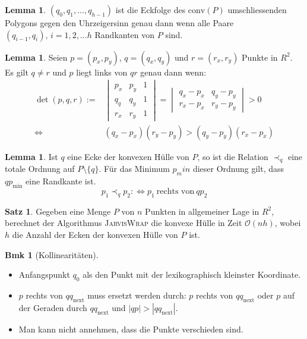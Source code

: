 \documentclass[a4paper, 10pt]{article}
\theoremstyle{definition}
\newtheorem{theorem}[definition]{Satz}
\newtheorem{nlemma}[definition]{Lemma}
\newtheorem*{note}{Bmk}
\theoremstyle{named}
\newcommand{\BO}{\mathcal{O}}
\newcommand{\conv}{\text{conv}}
\begin{document}
\begin{nlemma}
    $(q_0, q_1, \ldots, q_{h-1})$ ist die Eckfolge des $\conv(P)$ umschliessenden Polygons gegen den Uhrzeigersinn genau dann wenn alle Paare $(q_{i-1}, q_i), \, i = 1, 2, \ldots h$ Randkanten von $P$ sind.
\end{nlemma}

\begin{nlemma}
    Seien $p = (p_x, p_y)$, $q = (q_x, q_y)$ und $r = (r_x, r_y)$ Punkte in $R^2$. Es gilt $q \neq r$ und $p$ liegt links von $qr$ genau dann wenn:
    \begin{align*}
        \det(p, q, r) := &\begin{vmatrix}
            p_x & p_y & 1 \\
            q_q & q_y & 1 \\
            r_x & r_y & 1
        \end{vmatrix} = \begin{vmatrix}
            q_x - p_x & q_y - p_y \\
            r_x - p_x & r_y - p_y
        \end{vmatrix} > 0 \\
        \iff &(q_x - p_x)(r_y - p_y) > (q_y - p_y)(r_x - p_x)
    \end{align*}
\end{nlemma}

\begin{nlemma}
    Ist $q$ eine Ecke der konvexen Hülle von $P$, so ist die Relation $\prec_q$ eine totale Ordnung auf $P \setminus \{q\}$. Für das Minimum $p_min$ dieser Ordnung gilt, dass $qp_{\min}$ eine Randkante ist.
    $$p_1 \prec_q p_2 :\iff p_1 \ \text{rechts von} \ qp_2$$
\end{nlemma}

\begin{theorem}
    Gegeben eine Menge $P$ von $n$ Punkten in allgemeiner Lage in $R^2$, berechnet der Algorithmus \textsc{JarvisWrap} die konvexe Hülle in Zeit $\BO(nh)$, wobei $h$ die Anzahl der Ecken der konvexen Hülle von $P$ ist.
\end{theorem}

\begin{note}[Kollinearitäten] $\,$
    \begin{itemize}
        \item Anfangspunkt $q_0$ als den Punkt mit der lexikographisch kleinster Koordinate.
        \item $p$ rechts von $qq_{\text{next}}$ muss ersetzt werden durch: $p$ rechts von $qq_{\text{next}}$ oder $p$ auf der Geraden durch $qq_{\text{next}}$ und $|qp| > |qq_{\text{next}}|$.
        \item Man kann nicht annehmen, dass die Punkte verschieden sind.
    \end{itemize}
\end{note}
\end{document}
